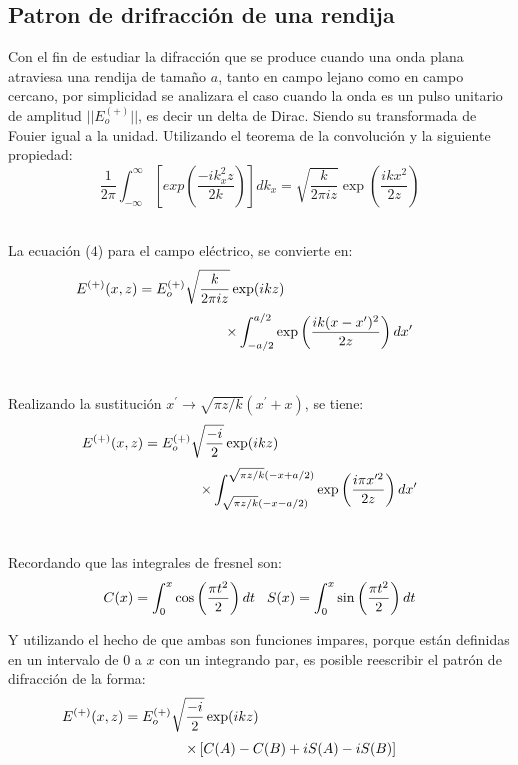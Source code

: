 \documentclass[11pt,letterpaper,twocolumn]{article}
\begin{document}
\subsection*{Patron de drifracción de una rendija}
Con el fin de estudiar la difracción que se produce cuando una onda plana atraviesa una rendija de tamaño $a$, tanto en campo lejano como en campo cercano, por simplicidad se analizara el caso cuando la onda es un pulso unitario de amplitud $||E_{o}^{(+)}||$, es decir un delta de Dirac. Siendo su transformada de Fouier igual a la unidad. Utilizando el teorema de la convolución y la siguiente propiedad:
$$\dfrac{1}{2\pi}\int_{-\infty}^{\infty}\left[ exp\left( \dfrac{-ik^{2}_{x}z}{2k}\right) \right]dk_{x}=\sqrt{\dfrac{k}{2 \pi i z}} \exp\left(\dfrac{ik x^{2}}{2z} \right)$$   \\
\par 
La ecuación ($4$) para el campo eléctrico, se convierte en:
$$E^{(+)}(x,z)= E^{(+)}_{o} \sqrt{\dfrac{k}{2 \pi i z}} \exp(ikz) \hspace*{4 cm} $$
$$\hspace*{3cm} \times \int_{-a/2}^{a/2} \exp\left( \dfrac{ik(x-x^{\prime})^{2}}{2z} \right) dx^{\prime}$$\\
\par 
Realizando la sustitución $x^{\prime} \longrightarrow \sqrt{\pi z/k} (x^{\prime} + x)$, se tiene: 
$$E^{(+)}(x,z)= E^{(+)}_{o} \sqrt{\dfrac{-i}{2}} \exp(ikz) \hspace*{4 cm} $$
$$\hspace*{2.5cm} \times \int_{\sqrt{\pi z/k}(-x-a/2)}^{\sqrt{\pi z/k}(-x+a/2)} \exp\left( \dfrac{i\pi x^{\prime 2}}{2z} \right) dx^{\prime}$$\\
\par 
Recordando que las integrales de fresnel son: 
\begin{equation}
C(x)=\int_{0}^{x} \cos\left(\dfrac{\pi t^{2}}{2}\right) dt \hspace*{0.3 cm} S(x)=\int_{0}^{x} \sin\left(\dfrac{\pi t^{2}}{2}\right) dt 
\end{equation}
\par 
Y utilizando el hecho de que ambas son funciones impares, porque están definidas en un intervalo de $0$ a $x$ con un integrando par, es posible reescribir el patrón de difracción de la forma: 
$$E^{(+)}(x,z)=E_{o}^{(+)} \sqrt{\dfrac{-i}{2}} \exp(ikz) \hspace*{5 cm }$$ 
\begin{equation}
\hspace*{1.6cm} \times \left[ C(A)-C(B) + iS(A)-iS(B) \right]
\end{equation}
\end{document}
